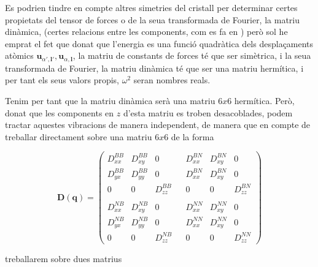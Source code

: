 \documentclass[12pt]{article} %
\let\vec\mathbf %
\begin{document}
Es podrien tindre en compte altres simetries del cristall per determinar certes propietats del tensor de forces o de la seua transformada de Fourier, la matriu dinàmica, (certes relacions entre les components, com es fa en \cite{falkovsky08_symmet_const_phonon_disper_graph}) però sol he emprat el fet que donat que l'energia es una funció quadràtica dels desplaçaments atòmics $\vec u_{\alpha',\vec l'}, \vec u_{\alpha,\vec l}$, la matriu de constants de forces té que ser simètrica,  i la seua transformada de Fourier, la matriu dinàmica té que ser una matriu hermítica, i per tant els seus valors propis, $\omega^2$ seran nombres reals.


Tenim per tant que la matriu dinàmica serà una matriu $6x6$ hermítica. Però, donat que les components en $z$ d'esta matriu es troben desacoblades, podem tractar aquestes vibracions de manera independent, de manera que en compte de treballar directament sobre una matriu $6x6$ de la forma

\begin{equation}
  \vec D(\vec q)=
  \begin{pmatrix}
   D_{xx}^{BB} & D_{xy}^{BB} & 0 &              & D_{xx}^{BN} & D_{xy}^{BN} & 0 \\
   D_{yx}^{BB} & D_{yy}^{BB} & 0 &              & D_{xx}^{BN} & D_{xy}^{BN} & 0 \\
       0       &     0       & D_{zz}^{BB} &    & 0  & 0  & D_{zz}^{BN}        \\
    &  &  &  &  &  \\
   D_{xx}^{NB} & D_{xy}^{NB} & 0 &              & D_{xx}^{NN} & D_{xy}^{NN} & 0 \\
   D_{yx}^{NB} & D_{yy}^{NB} & 0 &              & D_{xx}^{NN} & D_{xy}^{NN} & 0 \\
       0       &     0       & D_{zz}^{NB} &    & 0  & 0  & D_{zz}^{NN} 
  \end{pmatrix}
\end{equation}

treballarem sobre dues matrius 
\end{document}
